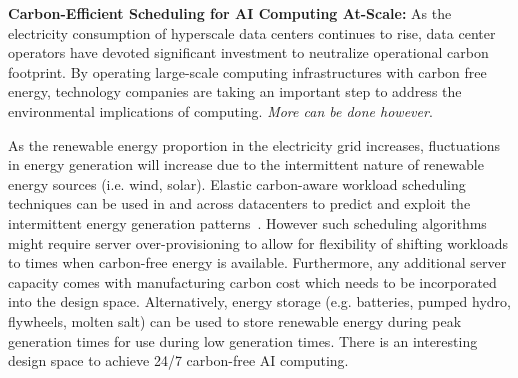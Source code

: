 

\textbf{Carbon-Efficient Scheduling for AI Computing At-Scale:}
As the electricity consumption of hyperscale data centers continues to rise, data center operators have devoted significant investment to neutralize operational carbon footprint.
By operating large-scale computing infrastructures with carbon free energy, technology companies
are taking an important step to address the environmental implications of computing.
\textit{More can be done however}.

As the renewable energy proportion in the electricity grid increases, fluctuations in 
energy generation will increase due to the intermittent nature of renewable energy sources (i.e. wind, solar). Elastic carbon-aware workload scheduling techniques
can be used in and across datacenters to predict and exploit the intermittent energy generation patterns~\cite{radovanovic2021carbon}. However such scheduling algorithms might require server over-provisioning to allow for flexibility of shifting workloads to times when carbon-free energy is available.
Furthermore, any additional server capacity comes with manufacturing carbon cost
which needs to be incorporated into the design space. 
Alternatively, energy storage (e.g. batteries, pumped hydro, flywheels, molten salt) can be used to store renewable
energy during peak generation times for use during low generation times. 
There is an interesting design space to achieve 24/7 carbon-free AI computing.


    
